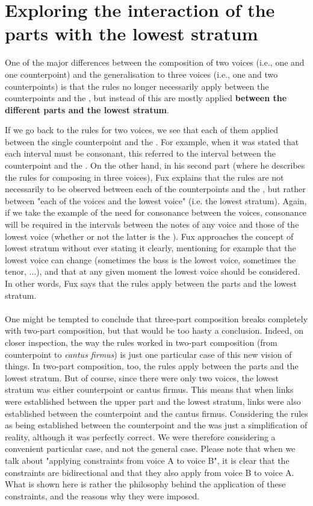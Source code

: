 \section{Exploring the interaction of the parts with the lowest stratum}

One of the major differences between the composition of two voices (i.e., one \cfs and one counterpoint) and the generalisation to three voices (i.e., one \cfs and two counterpoints) is that the rules no longer necessarily apply between the counterpoints and the \cf, but instead of this are mostly applied \textbf{between the different parts and the lowest stratum}. 

If we go back to the rules for two voices, we see that each of them applied between the single counterpoint and the \cf. For example, when it was stated that each interval must be consonant, this referred to the interval between the counterpoint and the \cf.
On the other hand, in his second part (where he describes the rules for composing in three voices), Fux explains that the rules are not necessarily to be observed between each of the counterpoints and the \cf, but rather between "each of the voices and the lowest voice" (i.e. the lowest stratum). Again, if we take the example of the need for consonance between the voices, consonance will be required in the intervals between the notes of any voice and those of the lowest voice (whether or not the latter is the \cf).
Fux approaches the concept of lowest stratum without ever stating it clearly, mentioning for example that the lowest voice can change (sometimes the bass is the lowest voice, sometimes the tenor, ...), and that at any given moment the lowest voice should be considered. In other words, Fux says that the rules apply between the parts and the lowest stratum.

\paragraph{}
One might be tempted to conclude that three-part composition breaks completely with two-part composition, but that would be too hasty a conclusion. Indeed, on closer inspection, the way the rules worked in two-part composition (from counterpoint to \textit{cantus firmus}) is just one particular case of this new vision of things. In two-part composition, too, the rules apply between the parts and the lowest stratum. But of course, since there were only two voices, the lowest stratum was either counterpoint or cantus firmus. This means that when links were established between the upper part and the lowest stratum, links were also established between the counterpoint and the cantus firmus. Considering the rules as being established between the counterpoint and the \cfs was just a simplification of reality, although it was perfectly correct. We were therefore considering a convenient particular case, and not the general case. Please note that when we talk about "applying constraints from voice A to voice B", it is clear that the constraints are bidirectional and that they also apply from voice B to voice A. What is shown here is rather the philosophy behind the application of these constraints, and the reasons why they were imposed.

